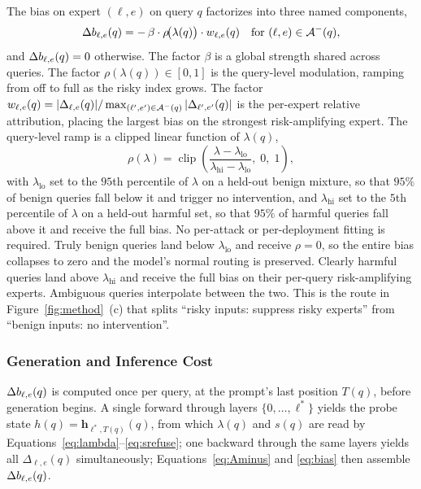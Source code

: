The bias on expert $(\ell,e)$ on query $q$ factorizes into three named components,
\begin{equation}
  \Delta b_{\ell,e}(q) = -\,\beta \cdot \rho\!\bigl(\lambda(q)\bigr) \cdot w_{\ell,e}(q)
  \quad \text{for } (\ell,e) \in {\mathcal{A}^{-}}(q),
  \label{eq:bias}
\end{equation}
and $\Delta b_{\ell,e}(q) = 0$ otherwise. The factor $\beta$ is a global strength shared across queries. The factor $\rho(\lambda(q)) \in [0,1]$ is the query-level modulation, ramping from off to full as the risky index grows. The factor $w_{\ell,e}(q) = |\Delta_{\ell,e}(q)| / \max_{(\ell',e') \in {\mathcal{A}^{-}}(q)} |\Delta_{\ell',e'}(q)|$ is the per-expert relative attribution, placing the largest bias on the strongest risk-amplifying expert. The query-level ramp is a clipped linear function of $\lambda(q)$,
\begin{equation}
  \rho(\lambda) = \operatorname{clip}\!\left(\frac{\lambda - \lambda_{\text{lo}}}{\lambda_{\text{hi}} - \lambda_{\text{lo}}},\; 0,\; 1\right),
  \label{eq:ramp}
\end{equation}
with $\lambda_{\text{lo}}$ set to the $95$th percentile of $\lambda$ on a held-out benign mixture, so that $95\%$ of benign queries fall below it and trigger no intervention, and $\lambda_{\text{hi}}$ set to the $5$th percentile of $\lambda$ on a held-out harmful set, so that $95\%$ of harmful queries fall above it and receive the full bias. No per-attack or per-deployment fitting is required. Truly benign queries land below $\lambda_{\text{lo}}$ and receive $\rho = 0$, so the entire bias collapses to zero and the model's normal routing is preserved. Clearly harmful queries land above $\lambda_{\text{hi}}$ and receive the full bias on their per-query risk-amplifying experts. Ambiguous queries interpolate between the two. This is the route in Figure~\ref{fig:method}~(c) that splits ``risky inputs: suppress risky experts'' from ``benign inputs: no intervention''.

\subsubsection{Generation and Inference Cost}
\label{sec:cost}

$\Delta b_{\ell,e}(q)$ is computed once per query, at the prompt's last position $T(q)$, before generation begins. A single forward through layers $\{0,\dots,\ell^*\}$ yields the probe state $h(q) = \mathbf{h}_{\ell^*, T(q)}(q)$, from which $\lambda(q)$ and $s(q)$ are read by Equations~\ref{eq:lambda}--\ref{eq:srefuse}; one backward through the same layers yields all $\Delta_{\ell,e}(q)$ simultaneously; Equations~\ref{eq:Aminus} and \ref{eq:bias} then assemble $\Delta b_{\ell,e}(q)$.

